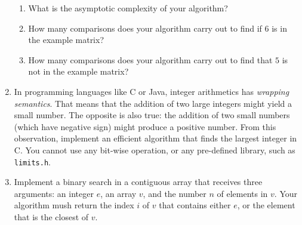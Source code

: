 \documentclass[12pt]{article}
\begin{document}
\begin{enumerate}
\begin{enumerate}
\item What is the asymptotic complexity of your algorithm?

\vspace{1cm}

\item How many comparisons does your algorithm carry out to find if $6$
is in the example matrix?

\vspace{1cm}

\item How many comparisons does your algorithm carry out to find that $5$
is not in the example matrix?
\end{enumerate}

\newpage

\item In programming languages like C or Java, integer arithmetics has
{\em wrapping semantics}.
That means that the addition of two large integers might yield a small
number.
The opposite is also true: the addition of two small numbers (which have negative
sign) might produce a positive number.
From this observation, implement an efficient algorithm that finds the
largest integer in C.
You cannot use any bit-wise operation, or any pre-defined library, such as
\texttt{limits.h}.

\vspace{7cm}

\item Implement a binary search in a contiguous array that receives three
arguments: an integer $e$, an array $v$, and the number $n$ of elements in
$v$.
Your algorithm mush return the index $i$ of $v$ that contains either $e$, or
the element that is the closest of $v$.

\end{enumerate}
\end{document}
